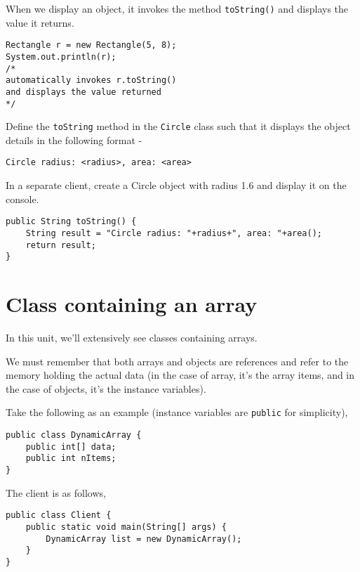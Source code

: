 When we display an object, it invokes the method \texttt{toString()} and displays the value it returns.

\begin{lstlisting}
Rectangle r = new Rectangle(5, 8);
System.out.println(r);
/*
automatically invokes r.toString() 
and displays the value returned
*/
\end{lstlisting}

\begin{exercise}
Define the \texttt{toString} method in the \texttt{Circle} class such that it displays the object details in the following format -

\begin{verbatim}
Circle radius: <radius>, area: <area>
\end{verbatim}

In a separate client, create a Circle object with radius 1.6 and display it on the console.
\end{exercise}
\begin{answer} \begin{lstlisting}
public String toString() {
	String result = "Circle radius: "+radius+", area: "+area();
	return result;
}	
\end{lstlisting} \end{answer}

\section{Class containing an array}

In this unit, we'll extensively see classes containing arrays. 

We must remember that both arrays and objects are references and refer to the memory holding the actual data (in the case of array, it's the array items, and in the case of objects, it's the instance variables).

Take the following as an example (instance variables are \texttt{public} for simplicity),

\begin{lstlisting}
public class DynamicArray {
	public int[] data;
	public int nItems;
}
\end{lstlisting}

The client is as follows,

\begin{lstlisting}
public class Client {
	public static void main(String[] args) {
		DynamicArray list = new DynamicArray();
	}
}
\end{lstlisting}

